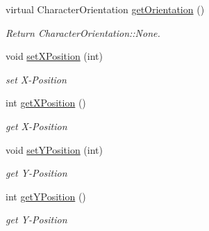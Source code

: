 \begin{DoxyCompactItemize}
\mbox{\label{class_game_sprite_aecf8f0273b4e847aa532f8980fb78997}} 
virtual Character\+Orientation \mbox{\hyperlink{class_game_sprite_aecf8f0273b4e847aa532f8980fb78997}{get\+Orientation}} ()
\begin{DoxyCompactList}\small\item\em Return Character\+Orientation\+::\+None. \end{DoxyCompactList}\item 
\mbox{\label{class_game_sprite_adcd973ba50bc01f1a5a8e81d7e468be3}} 
void \mbox{\hyperlink{class_game_sprite_adcd973ba50bc01f1a5a8e81d7e468be3}{set\+X\+Position}} (int)
\begin{DoxyCompactList}\small\item\em set X-\/\+Position \end{DoxyCompactList}\item 
\mbox{\label{class_game_sprite_adf371cf5b8636f7cfd8cb998460f7053}} 
int \mbox{\hyperlink{class_game_sprite_adf371cf5b8636f7cfd8cb998460f7053}{get\+X\+Position}} ()
\begin{DoxyCompactList}\small\item\em get X-\/\+Position \end{DoxyCompactList}\item 
\mbox{\label{class_game_sprite_a31f481d89973565bb2d0d55d0600c266}} 
void \mbox{\hyperlink{class_game_sprite_a31f481d89973565bb2d0d55d0600c266}{set\+Y\+Position}} (int)
\begin{DoxyCompactList}\small\item\em get Y-\/\+Position \end{DoxyCompactList}\item 
\mbox{\label{class_game_sprite_aea645d5397fc4cdbd386e3133e33a802}} 
int \mbox{\hyperlink{class_game_sprite_aea645d5397fc4cdbd386e3133e33a802}{get\+Y\+Position}} ()
\begin{DoxyCompactList}\small\item\em get Y-\/\+Position \end{DoxyCompactList}\end{DoxyCompactItemize}
